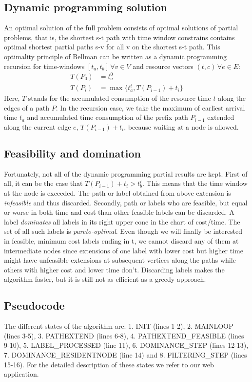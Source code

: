 \subsection{Dynamic programming solution}
An optimal solution of the full problem consists of optimal solutions of partial problems, that is, the shortest s-t path with time window constrains contains optimal shortest partial paths s-v for all v on the shortest s-t path. This optimality principle of Bellman \cite{bellman1957dynamic} can be written as a dynamic programming  recursion for time-windows $[t_a,t_b] \, \forall v \in V$ and resource vectors $(t,c) \, \forall e \in E$:
\begin{align*}
	T(P_0) &= t_a^0 \\
	T(P_i) &= \max\{t_a^i, T(P_{i-1}) + t_i\}
\end{align*}
Here, $T$ stands for the accumulated consumption of the resource time $t$ along the edges of a path $P$. In the recursion case, we take the maximum of earliest arrival time $t_a$ and accumulated time consumption of the prefix path $P_{i-1}$ extended along the current edge $e$, $T(P_{i-1}) + t_i$, because waiting at a node is allowed.

\subsection{Feasibility and domination}
Fortunately, not all of the dynamic programming partial results are kept. First of all, it can be the case that $T(P_{i-1}) + t_i > t_b^i$. This means that the time window at the node is exceeded. The path or label obtained from above extension is \textit{infeasible} and thus discarded.
Secondly, path or labels who are feasible, but equal or worse in both time and cost than other feasible labels can be discarded. A label \textit{dominates} all labels in its right upper cone in the chart of cost/time. The set of all such labels is \textit{pareto-optimal}. Even though we will finally be interested in feasible, minimum cost labels ending in t, we cannot discard any of them at intermediate nodes since extensions of one label with lower cost but higher time might have unfeasible extensions at subsequent vertices along the paths while others with higher cost and lower time don't.
Discarding labels makes the algorithm faster, but it is still not as efficient as a greedy  approach.


\subsection{Pseudocode}
The different states of the algorithm are: 1. INIT (lines 1-2), 2. MAINLOOP (lines 3-5), 3. PATHEXTEND (lines 6-8), 4. PATHEXTEND\_FEASIBLE (lines 9-10), 5. LABEL\_PROCESSED (line 11), 6. DOMINANCE\_STEP (lines 12-13), 7. DOMINANCE\_RESIDENTNODE (line 14) and 8. FILTERING\_STEP (lines 15-16). For the detailed description of these states we refer to our web application.


